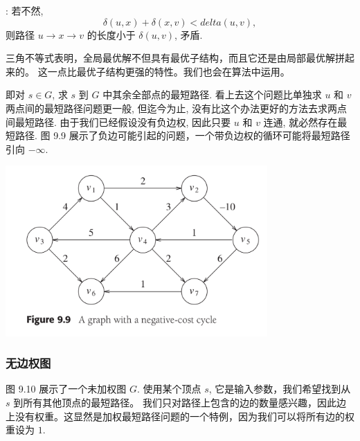 \documentclass[a4paper]{ctexart}
\theoremstyle{definition}
\theoremstyle{definition}
\begin{document}
: 若不然,
$$
\delta(u, x) + \delta(x, v) < delta(u, v),
$$
则路径 $u \to x \to v$ 的长度小于 $\delta(u, v)$, 矛盾. 

三角不等式表明，全局最优解不但具有最优子结构，而且它还是由局部最优解拼起来的。
这一点比最优子结构更强的特性。我们也会在算法中运用。






即对 $s \in G$, 求 $s$ 到 $G$ 中其余全部点的最短路径. 看上去这个问题比单独求
$u$ 和 $v$ 两点间的最短路径问题更一般, 但迄今为止, 没有比这个办法更好的方法去求两点间最短路径.
由于我们已经假设没有负边权, 因此只要 $u$ 和 $v$ 连通, 就必然存在最短路径. 
图 9.9 展示了负边可能引起的问题，一个带负边权的循环可能将最短路径引向 $-\infty$. 

\begin{center}
  \includegraphics[width=0.75\textwidth]{images/FIG9_9.png}
\end{center}

\subsubsection*{无边权图}

图 9.10 展示了一个未加权图 \(G\). 使用某个顶点 \(s\), 它是输入参数，我们希望找到从 \(s\) 到所有其他顶点的最短路径。
我们只对路径上包含的边的数量感兴趣，因此边上没有权重。这显然是加权最短路径问题的一个特例，因为我们可以将所有边的权重设为 $1$.
\end{document}
